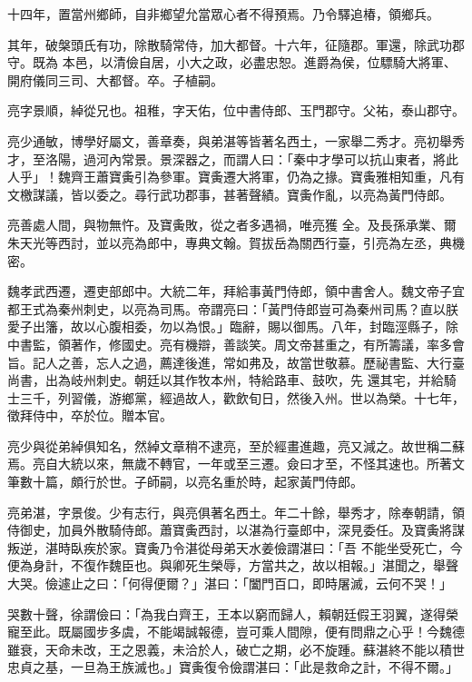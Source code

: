 \begin{pinyinscope}
 十四年，置當州鄉師，自非鄉望允當眾心者不得預焉。乃令驛追椿，領鄉兵。



 其年，破槃頭氏有功，除散騎常侍，加大都督。十六年，征隨郡。軍還，除武功郡守。既為
 本邑，以清儉自居，小大之政，必盡忠恕。進爵為侯，位驃騎大將軍、開府儀同三司、大都督。卒。子植嗣。



 亮字景順，綽從兄也。祖稚，字天佑，位中書侍郎、玉門郡守。父祐，泰山郡守。



 亮少通敏，博學好屬文，善章奏，與弟湛等皆著名西土，一家舉二秀才。亮初舉秀才，至洛陽，過河內常景。景深器之，而謂人曰：「秦中才學可以抗山東者，將此人乎」！魏齊王蕭寶夤引為參軍。寶夤遷大將軍，仍為之掾。寶夤雅相知重，凡有文檄謀議，皆以委之。尋行武功郡事，甚著聲績。寶夤作亂，以亮為黃門侍郎。



 亮善處人間，與物無忤。及寶夤敗，從之者多遇禍，唯亮獲
 全。及長孫承業、爾朱天光等西討，並以亮為郎中，專典文翰。賀拔岳為關西行臺，引亮為左丞，典機密。



 魏孝武西遷，遷吏部郎中。大統二年，拜給事黃門侍郎，領中書舍人。魏文帝子宜都王式為秦州刺史，以亮為司馬。帝謂亮曰：「黃門侍郎豈可為秦州司馬？直以朕愛子出籓，故以心腹相委，勿以為恨。」臨辭，賜以御馬。八年，封臨涇縣子，除中書監，領著作，修國史。亮有機辯，善談笑。周文帝甚重之，有所籌議，率多會旨。記人之善，忘人之過，薦達後進，常如弗及，故當世敬慕。歷祕書監、大行臺尚書，出為岐州刺史。朝廷以其作牧本州，特給路車、鼓吹，先
 還其宅，并給騎士三千，列習儀，游鄉黨，經過故人，歡飲旬日，然後入州。世以為榮。十七年，徵拜侍中，卒於位。贈本官。



 亮少與從弟綽俱知名，然綽文章稍不逮亮，至於經畫進趣，亮又減之。故世稱二蘇焉。亮自大統以來，無歲不轉官，一年或至三遷。僉曰才至，不怪其速也。所著文筆數十篇，頗行於世。子師嗣，以亮名重於時，起家黃門侍郎。



 亮弟湛，字景俊。少有志行，與亮俱著名西土。年二十餘，舉秀才，除奉朝請，領侍御史，加員外散騎侍郎。蕭寶夤西討，以湛為行臺郎中，深見委任。及寶夤將謀叛逆，湛時臥疾於家。寶夤乃令湛從母弟天水姜儉謂湛曰：「吾
 不能坐受死亡，今便為身計，不復作魏臣也。與卿死生榮辱，方當共之，故以相報。」湛聞之，舉聲大哭。儉遽止之曰：「何得便爾？」湛曰：「闔門百口，即時屠滅，云何不哭！」



 哭數十聲，徐謂儉曰：「為我白齊王，王本以窮而歸人，賴朝廷假王羽翼，遂得榮寵至此。既屬國步多虞，不能竭誠報德，豈可乘人間隙，便有問鼎之心乎！今魏德雖衰，天命未改，王之恩義，未洽於人，破亡之期，必不旋踵。蘇湛終不能以積世忠貞之基，一旦為王族滅也。」寶夤復令儉謂湛曰：「此是救命之計，不得不爾。」




\end{pinyinscope}

